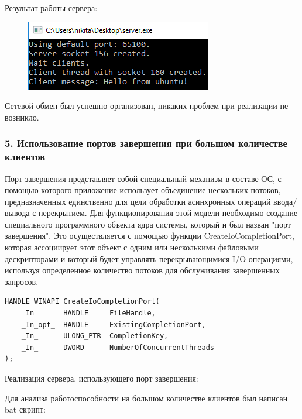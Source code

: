 \documentclass[14pt,a4paper,report]{report}
\begin{document}
Результат работы сервера:

\begin{figure}[h!]
	\centering
	\includegraphics[scale = 0.95]{images/p3_4_server_result.png}
	
	\caption{}
	\label{image:17}
\end{figure}

Сетевой обмен был успешно организован, никаких проблем при реализации не возникло.

\subsubsection{5. Использование портов завершения при большом количестве клиентов}

Порт завершения представляет собой специальный механизм в составе ОС, с помощью которого приложение использует объединение нескольких потоков, предназначенных единственно для цели обработки асинхронных операций ввода/вывода с перекрытием. Для функционирования этой модели необходимо создание специального программного объекта ядра системы, который и был назван "порт завершения". Это осуществляется с помощью функции CreateIoCompletionPort, которая ассоциирует этот объект с одним или несколькими файловыми дескрипторами и который будет управлять перекрывающимися I/O операциями, используя определенное количество потоков для обслуживания завершенных запросов.

\begin{verbatim}
HANDLE WINAPI CreateIoCompletionPort(
    _In_      HANDLE     FileHandle,
    _In_opt_  HANDLE     ExistingCompletionPort,
    _In_      ULONG_PTR  CompletionKey,
    _In_      DWORD      NumberOfConcurrentThreads
);
\end{verbatim}

Реализация сервера, использующего порт завершения:



\clearpage

Для анализа работоспособности на большом количестве клиентов был написан bat скрипт:


\end{document}
